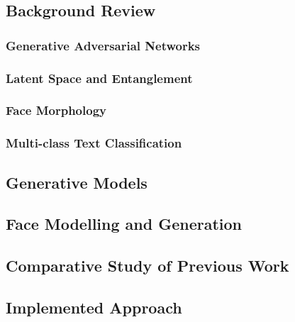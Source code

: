 \subsection{Background Review}

\subsubsection{Generative Adversarial Networks}

\subsubsection{Latent Space and Entanglement}

\subsubsection{Face Morphology}

\subsubsection{Multi-class Text Classification}

\subsection{Generative Models}

\subsection{Face Modelling and Generation}

\subsection{Comparative Study of Previous Work}

\subsection{Implemented Approach}
